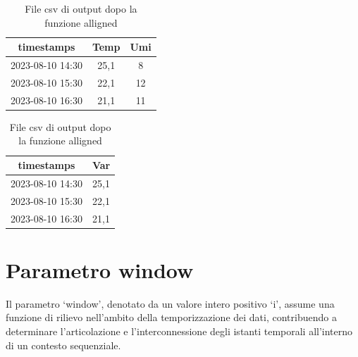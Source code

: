 \documentclass{rapportECL}
\begin{document}
\begin{table}[htp]
  \begin{minipage}{0.45\textwidth} %
    \centering
    \begin{tabular}{|c|c|c|}

      \hline
    timestamps & Temp & Umi\\
    \hline
    2023-08-10 14:30 & 25,1 & 8\\
    \hline
    2023-08-10 15:30 & 22,1 & 12\\
    \hline
    2023-08-10 16:30 & 21,1 & 11\\
    \hline
    
  
  \end{tabular}
  
  \caption{File di input dopo la funzione alligned}
  \end{minipage}
  \hfill %
  \begin{minipage}{0.45\textwidth} %
    \centering
    \begin{tabular}{|c|c|}

      \hline
    timestamps & Var\\
    \hline
    2023-08-10 14:30 & 25,1\\
    \hline
    2023-08-10 15:30 & 22,1\\
    \hline
    2023-08-10 16:30 & 21,1\\
    \hline
    
  
  \end{tabular}
  
  \caption{File csv di output dopo la funzione alligned}
  \end{minipage}
\end{table}

\section{Parametro window}
\label{win}

Il parametro `window', denotato da un valore intero positivo `i', assume una funzione di rilievo nell'ambito della temporizzazione dei dati, 
contribuendo a determinare l'articolazione e l'interconnessione degli istanti temporali all'interno di un contesto sequenziale.
\end{document}
